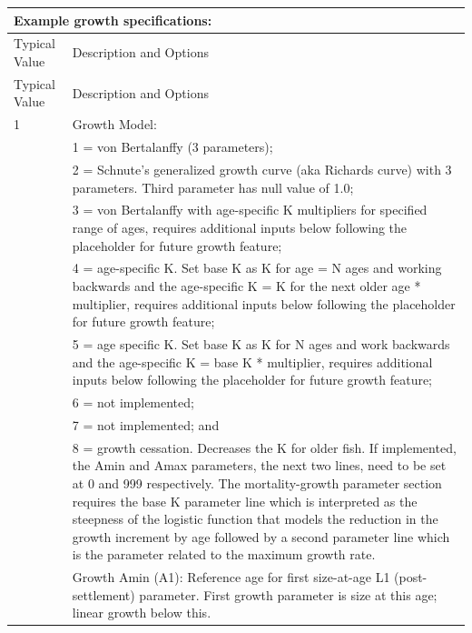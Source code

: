\vspace*{-\baselineskip}	
\begin{longtable}{p{0.5cm} p{2cm} p{12.5cm}}
	\multicolumn{3}{l}{Example growth specifications:} \Tstrut\Bstrut\\
	\hline	
	\multicolumn{2}{l}{Typical Value} & Description and Options \Tstrut\Bstrut\\
	\hline
	\endfirsthead

	\hline
	\multicolumn{2}{l}{Typical Value} & Description and Options \Tstrut\Bstrut\\
	\hline
	\endhead
	\hline

	\endfoot
	
	\endlastfoot

	1 & & Growth Model: \Tstrut\\
	  & & 1 = von Bertalanffy (3 parameters); \\
	  & & 2 = Schnute's generalized growth curve (aka Richards curve) with 3 parameters. Third parameter has null value of 1.0; \\
	  & & 3 = von Bertalanffy with age-specific K multipliers for specified range of ages, requires additional inputs below following the placeholder for future growth feature; \\
	  & & 4 = age-specific K. Set base K as K for age = N ages and working backwards and the age-specific K = K for the next older age * multiplier, requires additional inputs below following the placeholder for future growth feature; \\
	  & & 5 = age specific K. Set base K as K for N ages and work backwards and the age-specific K = base K * multiplier, requires additional inputs below following the placeholder for future growth feature; \\
	  & & 6 = not implemented; \\
	  & & 7 = not implemented; and \\
	  & & 8 = growth cessation. Decreases the K for older fish. If implemented, the Amin and Amax parameters, the next two lines, need to be set at 0 and 999 respectively. The mortality-growth parameter section requires the base K parameter line which is interpreted as the steepness of the logistic function that models the reduction in the growth increment by age followed by a second parameter line which is the parameter related to the maximum growth rate. \Bstrut\\
	\hline

	\Tstrut 1 & & Growth Amin (A1): Reference age for first size-at-age L1 (post-settlement) parameter. First growth parameter is size at this age; linear growth below this. \Bstrut\\


\end{longtable}
